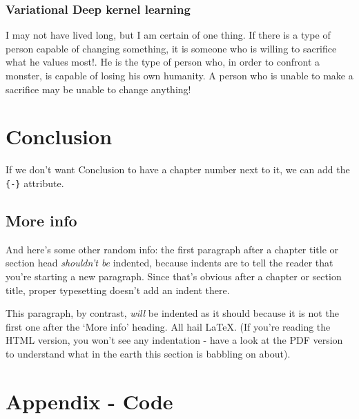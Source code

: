 \documentclass[a4paper, nobind]{templates/cdethesis}
\begin{document}
\subsection{Variational Deep kernel learning}

\begin{savequote}
I may not have lived long, but I am certain of one thing. If there is a
type of person capable of changing something, it is someone who is
willing to sacrifice what he values most!. He is the type of person who,
in order to confront a monster, is capable of losing his own humanity. A
person who is unable to make a sacrifice may be unable to change
anything!
\end{savequote}



\hypertarget{conclusion}{%
\chapter*{Conclusion}\label{conclusion}}

If we don't want Conclusion to have a chapter number next to it, we can add the \texttt{\{-\}} attribute.

\hypertarget{more-info}{%
\section*{More info}\label{more-info}}

And here's some other random info:
the first paragraph after a chapter title or section head \emph{shouldn't be} indented, because indents are to tell the reader that you're starting a new paragraph.
Since that's obvious after a chapter or section title, proper typesetting doesn't add an indent there.

This paragraph, by contrast, \emph{will} be indented as it should because it is not the first one after the `More info' heading.
All hail LaTeX. (If you're reading the HTML version, you won't see any indentation - have a look at the PDF version to understand what in the earth this section is babbling on about).

\startappendices

\hypertarget{appendix---code}{%
\chapter{Appendix - Code}\label{appendix---code}}
\end{document}
